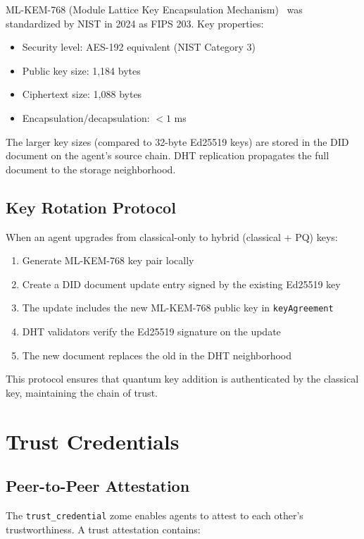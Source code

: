 \documentclass[11pt,twocolumn]{article}
\begin{document}
ML-KEM-768 (Module Lattice Key Encapsulation Mechanism)~\cite{nist2024pqc}
was standardized by NIST in 2024 as FIPS 203. Key properties:

\begin{itemize}[nosep]
  \item Security level: AES-192 equivalent (NIST Category 3)
  \item Public key size: 1,184 bytes
  \item Ciphertext size: 1,088 bytes
  \item Encapsulation/decapsulation: $<1$ ms
\end{itemize}

The larger key sizes (compared to 32-byte Ed25519 keys) are stored in the
DID document on the agent's source chain. DHT replication propagates the
full document to the storage neighborhood.

\subsection{Key Rotation Protocol}

When an agent upgrades from classical-only to hybrid (classical + PQ) keys:

\begin{enumerate}[nosep]
  \item Generate ML-KEM-768 key pair locally
  \item Create a DID document update entry signed by the existing Ed25519 key
  \item The update includes the new ML-KEM-768 public key in \texttt{keyAgreement}
  \item DHT validators verify the Ed25519 signature on the update
  \item The new document replaces the old in the DHT neighborhood
\end{enumerate}

This protocol ensures that quantum key addition is authenticated by the
classical key, maintaining the chain of trust.

\section{Trust Credentials}

\subsection{Peer-to-Peer Attestation}

The \texttt{trust\_credential} zome enables agents to attest to each other's
trustworthiness. A trust attestation contains:
\end{document}
